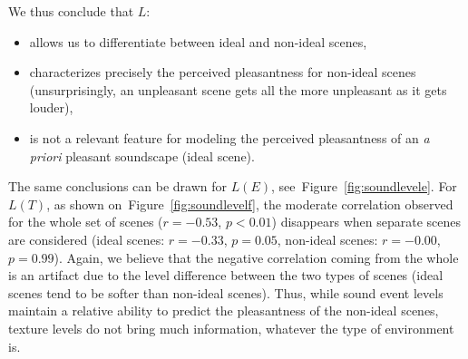 \documentclass[12pt]{elsarticle}
\newcommand{\cf}{cf.}
\begin{document}
%

We thus conclude that $L$:

\begin{itemize}
\item allows us to differentiate between ideal and non-ideal scenes,
\item characterizes precisely the perceived pleasantness for non-ideal scenes (unsurprisingly, an unpleasant scene gets all the more unpleasant as it gets louder),
\item is not a relevant feature for modeling the perceived pleasantness of an \textit{a priori} pleasant soundscape (ideal scene).
\end{itemize}


The same conclusions can be drawn for $L(E)$, see~Figure~\ref{fig:soundlevele}. For $L(T)$, as shown on~Figure~\ref{fig:soundlevelf}, the moderate correlation observed for the whole set of scenes ($r=-0.53$, $p<0.01$) disappears when separate scenes are considered (ideal scenes: $r=-0.33$, $p=0.05$, non-ideal scenes: $r=-0.00$, $p=0.99$). Again, we believe that the negative correlation coming from the whole is an artifact due to the level difference between the two types of scenes (ideal scenes tend to be softer than non-ideal scenes). Thus, while sound event levels maintain a relative ability to predict the pleasantness of the non-ideal scenes, texture levels do not bring much information, whatever the type of environment is.
\end{document}
